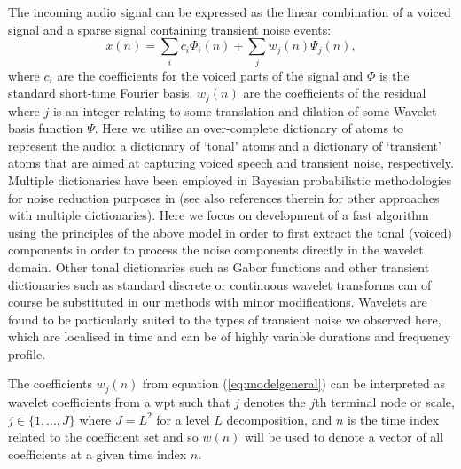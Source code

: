 The incoming audio signal can be expressed as the linear combination of a voiced signal and a sparse signal containing transient noise events:
\begin{equation}\label{eq:modelgeneral}
    x(n) = \sum_i c_i \Phi_i(n) + \sum_{j} w_{j}(n) \Psi_{j}(n),
\end{equation}
where $c_i$ are the coefficients for the voiced parts of the signal and $\Phi$ is the standard short-time Fourier basis. $w_{j}(n)$ are the coefficients of the residual where $j$ is an integer relating to some translation and dilation of some Wavelet basis function $\Psi$. Here we utilise an over-complete dictionary of atoms to represent the audio: a dictionary of `tonal' atoms and a dictionary of `transient' atoms that are aimed at capturing voiced speech and transient noise, respectively. Multiple dictionaries have been employed in Bayesian probabilistic methodologies for noise reduction purposes in \cite{Fevotte2006}\cite{Fevotte2008} (see also references therein for other approaches with multiple dictionaries). Here we focus on development of a fast algorithm using the principles of the above model in order to first extract the tonal (voiced) components in order to process the noise components directly in the wavelet domain. Other tonal dictionaries such as Gabor functions and other transient dictionaries such as standard discrete or continuous wavelet transforms can of course be substituted in our methods with minor modifications. Wavelets are found to be particularly suited to the types of transient noise we observed here, which are localised in time and can be of highly variable durations and frequency profile.

The coefficients $w_{j}(n)$ from equation (\ref{eq:modelgeneral}) can be interpreted as wavelet coefficients from a \DIFdelbegin {}\DIFdelend \DIFaddbegin \gls{wpt} \DIFaddend such that $j$ denotes the $j$th terminal node or scale, $j \in \{1, \ldots, J\}$ where $J = L^2$ for a level $L$ decomposition, and $n$ is the time index related to the coefficient set and so $w(n)$ will be used to denote a vector of all coefficients at a given time index $n$. \DIFaddbegin {}\DIFaddend %

